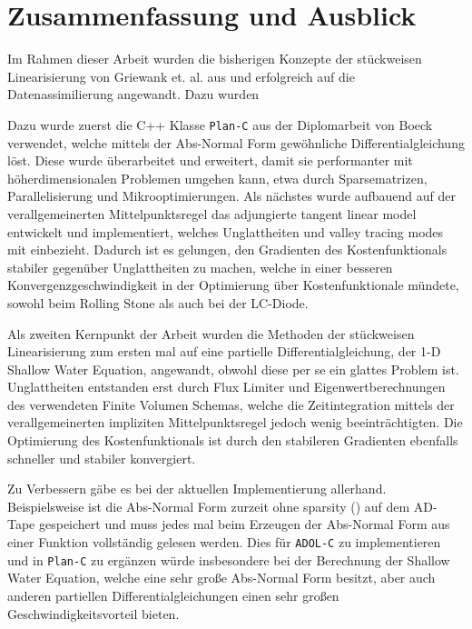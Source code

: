 \chapter{Zusammenfassung und Ausblick}

Im Rahmen dieser Arbeit wurden die bisherigen Konzepte der stückweisen Linearisierung von Griewank et. al. aus \cite{monster} und \cite{plan} erfolgreich auf die Datenassimilierung angewandt. Dazu wurden

Dazu wurde zuerst die C++ Klasse \texttt{Plan-C} aus der Diplomarbeit von Boeck \cite{boeck14} verwendet, welche mittels der Abs-Normal Form gewöhnliche Differentialgleichung löst. Diese wurde überarbeitet und erweitert, damit sie performanter mit höherdimensionalen Problemen umgehen kann, etwa durch Sparsematrizen, Parallelisierung und Mikrooptimierungen. Als nächstes wurde aufbauend auf der verallgemeinerten Mittelpunktsregel das adjungierte tangent linear model entwickelt und implementiert, welches Unglattheiten und valley tracing modes mit einbezieht. Dadurch ist es gelungen, den Gradienten des Kostenfunktionals stabiler gegenüber Unglattheiten zu machen, welche in einer besseren Konvergenzgeschwindigkeit in der Optimierung über Kostenfunktionale mündete, sowohl beim Rolling Stone als auch bei der LC-Diode.

Als zweiten Kernpunkt der Arbeit wurden die Methoden der stückweisen Linearisierung zum ersten mal auf eine partielle Differentialgleichung, der 1-D Shallow Water Equation, angewandt, obwohl diese per se ein glattes Problem ist. Unglattheiten entstanden erst durch Flux Limiter und Eigenwertberechnungen des verwendeten Finite Volumen Schemas, welche die Zeitintegration mittels der verallgemeinerten impliziten Mittelpunktsregel jedoch wenig beeinträchtigten. Die Optimierung des Kostenfunktionals ist durch den stabileren Gradienten ebenfalls schneller und stabiler konvergiert.

Zu Verbessern gäbe es bei der aktuellen Implementierung allerhand. Beispielsweise ist die Abs-Normal Form zurzeit ohne sparsity (\cite[S.137 ff.]{griewank2008evaluating}) auf dem AD-Tape gespeichert und muss jedes mal beim Erzeugen der Abs-Normal Form aus einer Funktion vollständig gelesen werden. Dies für \texttt{ADOL-C} zu implementieren und in \texttt{Plan-C} zu ergänzen  würde insbesondere bei der Berechnung der Shallow Water Equation, welche eine sehr große Abs-Normal Form besitzt, aber auch anderen partiellen Differentialgleichungen einen sehr großen Geschwindigkeitsvorteil bieten. 


